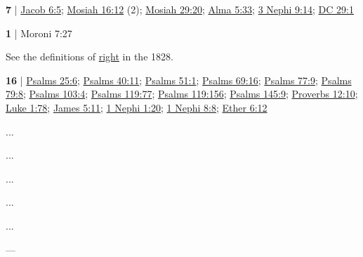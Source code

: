 	\begin{compactdesc}
	
		\item[arm of mercy] \textbf{7} | \hyperref[JACOB-6-5]{Jacob 6:5}; \hyperref[MOSIAH-16-12]{Mosiah 16:12} (2); \hyperref[MOSIAH-29-20]{Mosiah 29:20}; \hyperref[ALMA-5-33]{Alma 5:33}; \hyperref[3NEPHI-9-14]{3 Nephi 9:14}; \hyperref[DC29-1]{DC 29:1}
		
		\item[right(s) of mercy] \textbf{1} | Moroni 7:27
			\begin{compactdesc}
				\item[Commentary] See the definitions of \hyperref[RIGHT-NOUN-1828]{right} in the 1828.
			\end{compactdesc}
			
		\item[tender mercy] \textbf{16} | \hyperref[PSALMS-25-6]{Psalms 25:6}; \hyperref[PSALMS-40-11]{Psalms 40:11}; \hyperref[PSALMS-51-1]{Psalms 51:1}; \hyperref[PSALMS-69-16]{Psalms 69:16}; \hyperref[PSALMS-77-9]{Psalms 77:9}; \hyperref[PSALMS-79-8]{Psalms 79:8}; \hyperref[PSALMS-103-4]{Psalms 103:4}; \hyperref[PSALMS-119-77]{Psalms 119:77}; \hyperref[PSALMS-119-156]{Psalms 119:156}; \hyperref[PSALMS-145-9]{Psalms 145:9}; \hyperref[PROVERBS-12-10]{Proverbs 12:10}; \hyperref[LUKE-1-78]{Luke 1:78}; \hyperref[JAMES-5-11]{James 5:11}; \hyperref[1NEPHI-1-20]{1 Nephi 1:20}; \hyperref[1NEPHI-8-8]{1 Nephi 8:8}; \hyperref[ETHER-6-12]{Ether 6:12}
			\begin{compactdesc}
				\item[Bible anchor verses] \phantom{.}
					\begin{compactdesc}
						\item[Psalms 25:6] ...
						\item[Psalms 103:4] ...
						\item[Proverbs 12:10] ...
						\item[Luke 1:78] ...
						\item[James 5:11] ...
					\end{compactdesc}
				\item[Commentary] ---
			\end{compactdesc}
		
	\end{compactdesc}
	

